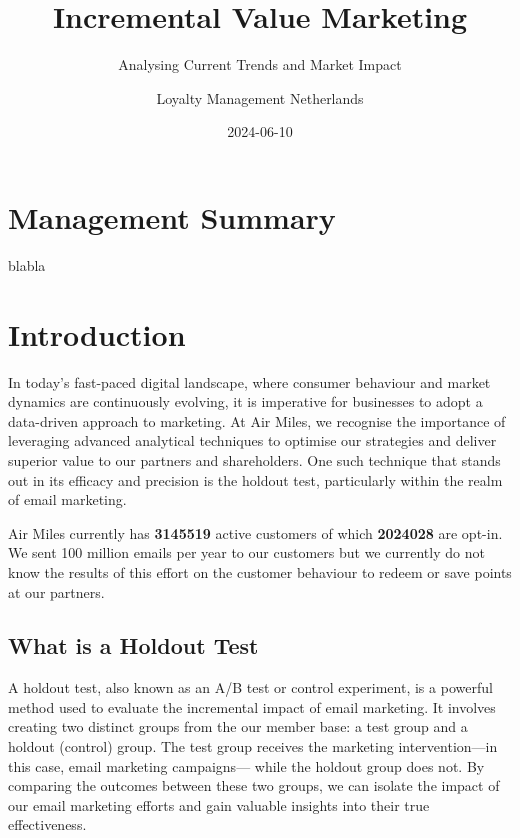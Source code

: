 \documentclass[
  10pt,
]{article}
\title{Incremental Value Marketing}
\subtitle{Analysing Current Trends and Market Impact}
\author{Loyalty Management Netherlands}
\date{2024-06-10}
\begin{document}
\maketitle

{
\hypersetup{linkcolor=}
\setcounter{tocdepth}{2}
\tableofcontents
}
\hfill\break

\newpage

\hypertarget{management-summary}{%
\section{Management Summary}\label{management-summary}}

blabla

\newpage

\hypertarget{introduction}{%
\section{Introduction}\label{introduction}}

In today's fast-paced digital landscape, where consumer behaviour and
market dynamics are continuously evolving, it is imperative for
businesses to adopt a data-driven approach to marketing. At Air Miles,
we recognise the importance of leveraging advanced analytical techniques
to optimise our strategies and deliver superior value to our partners
and shareholders. One such technique that stands out in its efficacy and
precision is the holdout test, particularly within the realm of email
marketing.

Air Miles currently has \textbf{3145519} active customers of which
\textbf{2024028} are opt-in. We sent 100 million emails per year to our
customers but we currently do not know the results of this effort on the
customer behaviour to redeem or save points at our partners.

\hypertarget{what-is-a-holdout-test}{%
\subsection{What is a Holdout Test}\label{what-is-a-holdout-test}}

A holdout test, also known as an A/B test or control experiment, is a
powerful method used to evaluate the incremental impact of email
marketing. It involves creating two distinct groups from the our member
base: a test group and a holdout (control) group. The test group
receives the marketing intervention---in this case, email marketing
campaigns--- while the holdout group does not. By comparing the outcomes
between these two groups, we can isolate the impact of our email
marketing efforts and gain valuable insights into their true
effectiveness.
\end{document}
